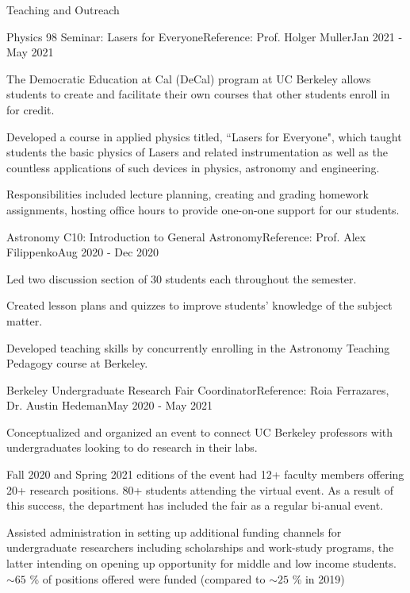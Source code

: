 \documentclass{resume} %
\begin{document}
\begin{rSection}{Teaching and Outreach}

\begin{rSubsection}{Physics 98 Seminar: Lasers for Everyone}{}{Reference: Prof. Holger Muller}{Jan 2021 - May 2021} \\
\item The Democratic Education at Cal (DeCal) program at UC Berkeley allows students to create and facilitate their own courses that other students enroll in for credit.
\item Developed a course in applied physics titled, ``Lasers for Everyone", which taught students the basic physics of Lasers and related instrumentation as well as the countless applications of such devices in physics, astronomy and engineering.
\item Responsibilities included lecture planning, creating and grading homework assignments, hosting office hours to provide one-on-one support for our students.
\end{rSubsection}


\begin{rSubsection}{Astronomy C10: Introduction to General Astronomy}{}{Reference: Prof. Alex Filippenko}{Aug 2020 - Dec 2020} \\
\item Led two discussion section of 30 students each throughout the semester.
\item Created lesson plans and quizzes to improve students' knowledge of the subject matter.
\item Developed teaching skills by concurrently enrolling in the Astronomy Teaching Pedagogy course at Berkeley.
\end{rSubsection}

\begin{rSubsection}{Berkeley Undergraduate Research Fair Coordinator}{}{Reference: Roia Ferrazares, Dr. Austin Hedeman}{May 2020 - May 2021} \\
\item Conceptualized and organized an event to connect UC Berkeley professors with undergraduates looking to do research in their labs.
\item Fall 2020 and Spring 2021 editions of the event had 12+ faculty members offering 20+ research positions. 80+ students attending the virtual event. As a result of this success, the department has included the fair as a regular bi-anual event.
\item Assisted administration in setting up additional funding channels for undergraduate researchers including scholarships and work-study programs, the latter intending on opening up opportunity for middle and low income students.  $\sim 65$ \% of positions offered were funded (compared to $\sim 25$ \% in 2019)
\end{rSubsection}


\end{rSection}
\end{document}
